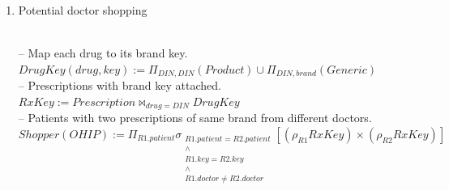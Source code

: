 \documentclass{article}
\newcommand{\var}[1]{\mathit{#1}}
\begin{document}
\begin{enumerate}
{-- Allowed drugs are cheapest generics or brand drugs with no generics. \\[5pt]
$
AllowedDIN(\var{DIN}) :=
  CheapestGen \cup BrandNoGen
$ \\[10pt]

-- Prescriptions involving priced drugs. \\[5pt]
$
RxPriced :=
  \var{Prescription} \bowtie_{\var{drug} = \var{DIN}} PricedDIN
$ \\[10pt]

-- Doctors who prescribed a disallowed drug. \\[5pt]
$
BadDoctor(\var{doctor}) :=
  \Pi_{\var{doctor}}
  (\sigma_{\neg(\var{drug} = \var{DIN})}
   (RxPriced \times AllowedDIN))
$ \\[10pt]

-- Doctors who prescribed at least two different priced drugs. \\[5pt]
$
TwoDrugs(\var{doctor}) :=
  \Pi_{P1.\var{doctor}}
  \sigma_{\substack{
    P1.\var{doctor} = P2.\var{doctor} \\
    \wedge \\
    P1.\var{drug} \neq P2.\var{drug}
  }}
  [ (\rho_{P1}RxPriced) \times (\rho_{P2}RxPriced) ]
$ \\[10pt]

-- Final answer. \\[5pt]
$
Answer(\var{doctor}) :=
  TwoDrugs - BadDoctor
$
}

\item {\large Potential doctor shopping}

{~}\\
{\large
-- Map each drug to its brand key. \\[5pt]
$
DrugKey(\var{drug}, \var{key}) :=
  \Pi_{\var{DIN}, \var{DIN}}(\var{Product})
  \cup
  \Pi_{\var{DIN}, \var{brand}}(\var{Generic})
$ \\[10pt]

-- Prescriptions with brand key attached. \\[5pt]
$
RxKey :=
  \var{Prescription} \bowtie_{\var{drug} = \var{DIN}} DrugKey
$ \\[10pt]

-- Patients with two prescriptions of same brand from different doctors. \\[5pt]
$
Shopper(\var{OHIP}) :=
  \Pi_{R1.\var{patient}}
  \sigma_{\substack{
    R1.\var{patient} = R2.\var{patient} \\
    \wedge \\
    R1.\var{key} = R2.\var{key} \\
    \wedge \\
    R1.\var{doctor} \neq R2.\var{doctor}
  }}
  [ (\rho_{R1}RxKey) \times (\rho_{R2}RxKey) ]
$ \\[10pt]

}
\end{enumerate}
\end{document}
